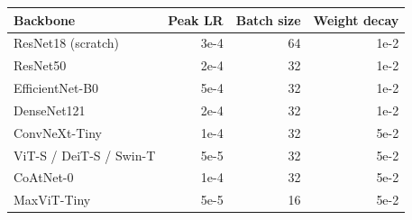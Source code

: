\begin{tabular}{lrrr}
\toprule
Backbone & Peak LR & Batch size & Weight decay \\
\midrule
ResNet18 (scratch) & 3e-4 & 64 & 1e-2 \\
ResNet50 & 2e-4 & 32 & 1e-2 \\
EfficientNet-B0 & 5e-4 & 32 & 1e-2 \\
DenseNet121 & 2e-4 & 32 & 1e-2 \\
ConvNeXt-Tiny & 1e-4 & 32 & 5e-2 \\
ViT-S / DeiT-S / Swin-T & 5e-5 & 32 & 5e-2 \\
CoAtNet-0 & 1e-4 & 32 & 5e-2 \\
MaxViT-Tiny & 5e-5 & 16 & 5e-2 \\
\bottomrule
\end{tabular}
